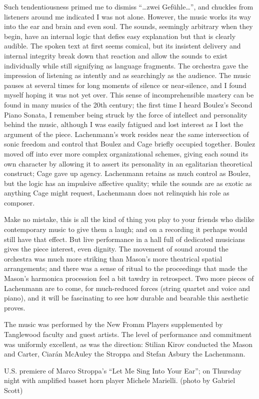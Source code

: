 Such tendentiousness primed me to dismiss “…zwei Gefühle…”, and chuckles from listeners around me indicated I was not alone. However, the music works its way into the ear and brain and even soul. The sounds, seemingly arbitrary when they begin, have an internal logic that defies easy explanation but that is clearly audible. The spoken text at first seems comical, but its insistent delivery and internal integrity break down that reaction and allow the sounds to exist individually while still signifying as language fragments. The orchestra gave the impression of listening as intently and as searchingly as the audience. The music pauses at several times for long moments of silence or near-silence, and I found myself hoping it was not yet over. This sense of incomprehensible mastery can be found in many musics of the 20th century; the first time I heard Boulez’s Second Piano Sonata, I remember being struck by the force of intellect and personality behind the music, although I was easily fatigued and lost interest as I lost the argument of the piece. Lachenmann’s work resides near the same intersection of sonic freedom and control that Boulez and Cage briefly occupied together. Boulez moved off into ever more complex organizational schemes, giving each sound its own character by allowing it to assert its personality in an egalitarian theoretical construct; Cage gave up agency. Lachenmann retains as much control as Boulez, but the logic has an impulsive affective quality; while the sounds are as exotic as anything Cage might request, Lachenmann does not relinquish his role as composer.

Make no mistake, this is all the kind of thing you play to your friends who dislike contemporary music to give them a laugh; and on a recording it perhaps would still have that effect. But live performance in a hall full of dedicated musicians gives the piece interest, even dignity. The movement of sound around the orchestra was much more striking than Mason’s more theatrical spatial arrangements; and there was a sense of ritual to the proceedings that made the Mason’s harmonica procession feel a bit tawdry in retrospect. Two more pieces of Lachenmann are to come, for much-reduced forces (string quartet and voice and piano), and it will be fascinating to see how durable and bearable this aesthetic proves.

The music was performed by the New Fromm Players supplemented by Tanglewood faculty and guest artists. The level of performance and commitment was uniformly excellent, as was the direction: Stilian Kirov conducted the Mason and Carter, Ciarán McAuley the Stroppa and Stefan Asbury the Lachenmann.

U.S. premiere of Marco Stroppa's ``Let Me Sing Into Your Ear''; on Thursday night with amplified basset horn player Michele Marielli. (photo by Gabriel Scott)
